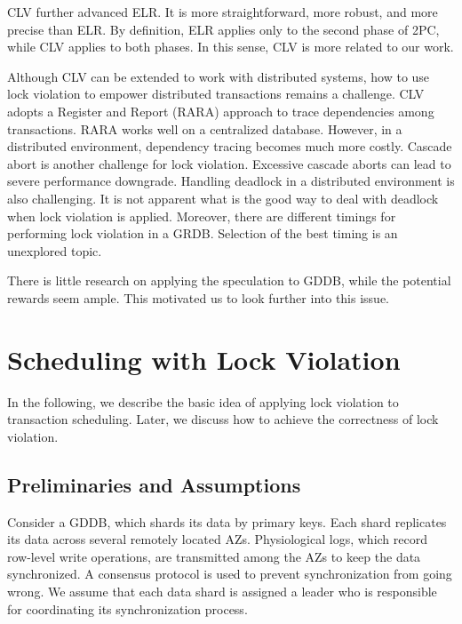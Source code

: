 \documentclass[conference]{IEEEtran}
\begin{document}

CLV further advanced ELR. 
It is more straightforward, more robust, and more precise than ELR.
By definition, ELR  applies only to the second phase of 2PC, while CLV applies to both phases.
In this sense, CLV is more related to our work.

Although CLV can be extended to work with distributed systems, 
how to use lock violation to empower distributed transactions remains a challenge.
CLV adopts a Register and Report (RARA) approach \cite{HeckatonMVCC:journals/pvldb/LarsonBDFPZ11} to trace dependencies among transactions.
RARA works well on a centralized database. 
However, in a distributed environment, dependency tracing becomes much more costly.
Cascade abort is another challenge for lock violation. 
Excessive cascade aborts can lead to severe performance downgrade.
Handling deadlock in a distributed environment is also challenging. It is not apparent what is the good way to deal with deadlock when lock violation is applied.
Moreover, there are different timings for performing lock violation in a GRDB. Selection of the best timing is an unexplored topic.
  

There is little research on applying the speculation to GDDB, while the potential rewards seem ample. This motivated us to look further into this issue.


\section{Scheduling with Lock Violation}
\label{sec:non_strict}

In the following, we describe the basic idea of applying lock violation to transaction scheduling.
Later, we discuss how to achieve the correctness of lock violation.

\subsection{Preliminaries and Assumptions}
Consider a GDDB, which shards its data by primary keys.
Each shard replicates its data across several remotely located AZs.
Physiological logs, which record row-level write operations, are transmitted among the AZs to keep the data synchronized.
A consensus protocol is used to prevent synchronization from going wrong.
We assume that each data shard is assigned a leader who is responsible for coordinating its synchronization process.
\end{document}
